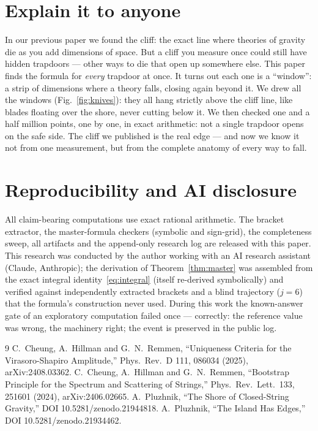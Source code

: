 \documentclass[11pt]{article}
\begin{document}
\section*{Explain it to anyone}
In our previous paper we found the cliff: the exact line where theories of
gravity die as you add dimensions of space. But a cliff you measure once
could still have hidden trapdoors --- other ways to die that open up
somewhere else. This paper finds the formula for \emph{every} trapdoor at
once. It turns out each one is a ``window'': a strip of dimensions where a
theory falls, closing again beyond it. We drew all the windows
(Fig.~\ref{fig:knives}): they all hang strictly above the cliff line, like
blades floating over the shore, never cutting below it. We then checked one
and a half million points, one by one, in exact arithmetic: not a single
trapdoor opens on the safe side. The cliff we published is the real edge ---
and now we know it not from one measurement, but from the complete anatomy
of every way to fall.

\section*{Reproducibility and AI disclosure}
All claim-bearing computations use exact rational arithmetic. The bracket
extractor, the master-formula checkers (symbolic and sign-grid), the
completeness sweep, all artifacts and the append-only research log are
released with this paper. This research was conducted by the author working
with an AI research assistant (Claude, Anthropic); the derivation of
Theorem~\ref{thm:master} was assembled from the exact integral
identity~\eqref{eq:integral} (itself re-derived symbolically) and verified
against independently extracted brackets and a blind trajectory ($j{=}6$)
that the formula's construction never used. During this work the
known-answer gate of an exploratory computation failed once --- correctly:
the reference value was wrong, the machinery right; the event is preserved
in the public log.

\begin{thebibliography}{9}
 C.~Cheung, A.~Hillman and G.~N.~Remmen,
``Uniqueness Criteria for the Virasoro-Shapiro Amplitude,''
Phys.\ Rev.\ D 111, 086034 (2025), arXiv:2408.03362.
 C.~Cheung, A.~Hillman and G.~N.~Remmen,
``Bootstrap Principle for the Spectrum and Scattering of Strings,''
Phys.\ Rev.\ Lett.\ 133, 251601 (2024), arXiv:2406.02665.
 A.~Pluzhnik, ``The Shore of Closed-String Gravity,''
DOI 10.5281/zenodo.21944818.
 A.~Pluzhnik, ``The Island Has Edges,''
DOI 10.5281/zenodo.21934462.
\end{thebibliography}
\end{document}
